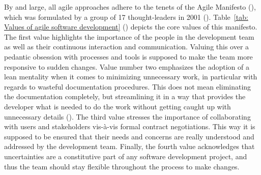 By and large, all agile approaches adhere to the tenets of the Agile Manifesto (\cite*{AgileManifesto2001}), which was formulated by a group of 17 thought-leaders in 2001 (\cite{Rigby2016a}). Table~\ref{tab: Values of agile software development} (\cite{Dingsoyr2012}) depicts the core values of this manifesto. The first value highlights the importance of the people in the development team as well as their continuous interaction and communication. Valuing this over a pedantic obsession with processes and tools is supposed to make the team more responsive to sudden changes. Value number two emphasizes the adoption of a lean mentality when it comes to minimizing unnecessary work, in particular with regards to wasteful documentation procedures. This does not mean eliminating the documentation completely, but streamlining it in a way that provides the developer what is needed to do the work without getting caught up with unnecessary details (\cite{Eby2016}). The third value stresses the importance of collaborating with users and stakeholders vis-à-vis formal contract negotiations. This way it is supposed to be ensured that their needs and concerns are really understood and addressed by the development team. Finally, the fourth value acknowledges that uncertainties are a constitutive part of any software development project, and thus the team should stay flexible throughout the process to make changes.

\begin{wrapfigure}[8]{r}{0.6\textwidth}
	\centering
	\texttt{[image: \{"Latex/THESIS/Figures/Agile"]}.png}
	\caption[Agile development process]{Agile development process (Author's visualisation)}
	\label{fig:Agile development process}
\end{wrapfigure}

